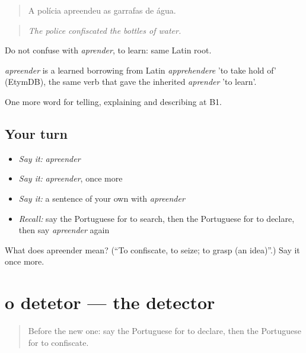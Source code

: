 \begin{quote}
A polícia apreendeu as garrafas de água.
\end{quote}

\begin{quote}
\emph{The police confiscated the bottles of water.}
\end{quote}

Do not confuse with \emph{aprender}, to learn: same Latin root.

\begin{cousinweb}
\emph{apreender} is a learned borrowing from Latin \emph{apprehendere} 'to take hold of' (EtymDB), the same verb that gave the inherited \emph{aprender} 'to learn'.
\end{cousinweb}

\begin{grammarlens}[title={What you've built}]
One more word for telling, explaining and describing at B1.
\end{grammarlens}

\subsection*{Your turn}
\begin{itemize}
\raggedright
  \item \emph{Say it:} \emph{apreender}
  \item \emph{Say it:} \emph{apreender}, once more
  \item \emph{Say it:} a sentence of your own with \emph{apreender}
  \item \emph{Recall:} say the Portuguese for to search, then the Portuguese for to declare, then say \emph{apreender} again
\end{itemize}

\begin{tcolorbox}[breakable,colback=teal!4,colframe=teal!35!black,title={Before you move on}]
What does apreender mean? (\textquotedblleft{}To confiscate, to seize; to grasp (an idea)\textquotedblright{}.) Say it once more.
\end{tcolorbox}
\section[o detetor]{o detetor — the detector}

\label{lesson:PT-C423-detetor}



\begin{quote}
Before the new one: say the Portuguese for to declare, then the Portuguese for to confiscate.
\end{quote}

